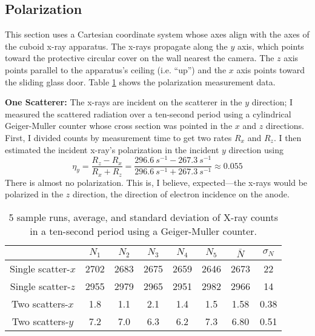 \documentclass[11pt, a4paper]{article}
\begin{document}
\subsection{Polarization}
This section uses a Cartesian coordinate system whose axes align with the axes of the cuboid x-ray apparatus. The x-rays propagate along the $ y $ axis, which points toward the protective circular cover on the wall nearest the camera. The $ z $ axis points parallel to the apparatus's ceiling (i.e. ``up'') and the $ x $ axis points toward the sliding glass door. Table \ref{xray:table:polarization-data} shows the polarization measurement data.


\vspace{2mm}
\textbf{One Scatterer:} The x-rays are incident on the scatterer in the $ y $ direction; I measured the scattered radiation over a ten-second period using a cylindrical Geiger-Muller counter whose cross section was pointed in the $ x $ and $ z $ directions. First, I divided counts by measurement time to get two rates $ R_{x} $ and $ R_{z} $. I then estimated the incident x-ray's polarization in the incident $ y $ direction using
\begin{equation*}
	\eta_{y} = \frac{R_{z} - R_{x}}{R_{x} + R_{z}} = \frac{\SI{296.6}{s^{-1}} -  \SI{267.3 }{s^{-1}}}{\SI{296.6}{s^{-1}} + \SI{267.3 }{s^{-1}}} \approx 0.055
\end{equation*}
There is almost no polarization. This is, I believe, expected---the x-rays would be polarized in the $ z $ direction, the direction of electron incidence on the anode.


\begin{table}[h]
\begin{center}
    \begin{tabular}{c|ccccccc}
        & $ N_{1} $ & $ N_{2} $ & $ N_{3} $ & $ N_{4} $ & $ N_{5} $ & $ \bar{N} $ & $ \sigma_{N} $ \\
        \hline
        Single scatter-$ x $ & 2702 & 2683 & 2675 & 2659 & 2646 & 2673 & 22 \\
        Single scatter-$ z $ & 2955 & 2979 & 2965 & 2951 & 2982 & 2966 & 14 \\
        Two scatters-$ x $ & 1.8 & 1.1 & 2.1 & 1.4 & 1.5 & 1.58 & 0.38\\
        Two scatters-$ y $ & 7.2 & 7.0 & 6.3 & 6.2 & 7.3 & 6.80 & 0.51
	\end{tabular}
	\caption{5 sample runs, average, and standard deviation of X-ray counts in a ten-second period using a Geiger-Muller counter. }
	\label{xray:table:polarization-data}
\end{center}
\end{table}
\end{document}
